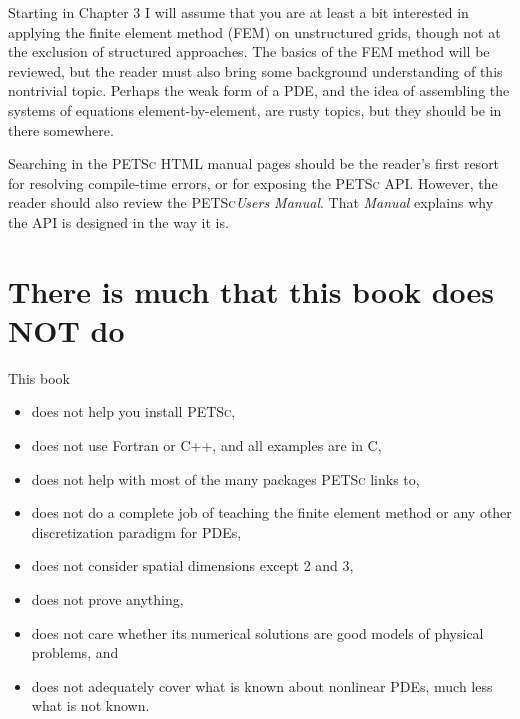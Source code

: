 \documentclass{tufte-book}
\theoremstyle{definition}
\newcommand{\PETSc}{\textsc{PETSc}\xspace}
\begin{document}
Starting in Chapter 3 I will assume that you are at least a bit interested in applying the finite element method (FEM) on unstructured grids, though not at the exclusion of structured approaches.  The basics of the FEM method will be reviewed, but the reader must also bring some background understanding of this nontrivial topic.  Perhaps the weak form of a PDE, and the idea of assembling the systems of equations element-by-element, are rusty topics, but they should be in there somewhere.

Searching in the \PETSc HTML manual pages should be the reader's first resort for resolving compile-time errors, or for exposing the \PETSc API.  However, the reader should also review the \PETSc \emph{Users Manual}.  That \emph{Manual} explains why the API is designed in the way it is.


\section{There is much that this book does NOT do}

This book\begin{itemize}
\item  does not help you install \PETSc,
\item  does not use Fortran or C++, and all examples are in C,
\item  does not help with most of the many packages \PETSc links to,
\item  does not do a complete job of teaching the finite element method or any other discretization paradigm for PDEs,
\item  does not consider spatial dimensions except 2 and 3,
\item  does not prove anything,
\item  does not care whether its numerical solutions are good models of physical problems, and
\item  does not adequately cover what is known about nonlinear PDEs, much less what is not known.
\end{itemize}


\mainmatter




\end{document}
